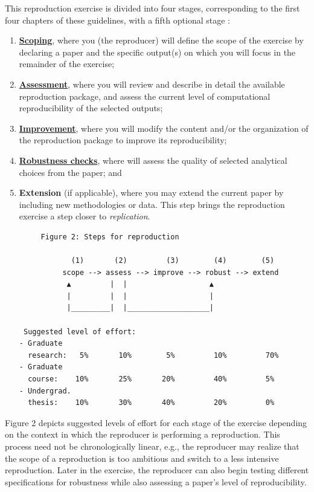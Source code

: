 \documentclass[]{book}
\begin{document}
This reproduction exercise is divided into four stages, corresponding to the first four chapters of these guidelines, with a fifth optional stage :

\begin{enumerate}
\def\labelenumi{\arabic{enumi}.}
\item
  \protect\hyperlink{scoping}{\textbf{Scoping}}, where you (the reproducer) will define the scope of the exercise by declaring a paper and the specific output(s) on which you will focus in the remainder of the exercise;\\
\item
  \protect\hyperlink{assessment}{\textbf{Assessment}}, where you will review and describe in detail the available reproduction package, and assess the current level of computational reproducibility of the selected outputs;
\item
  \protect\hyperlink{improvements}{\textbf{Improvement}}, where you will modify the content and/or the organization of the reproduction package to improve its reproducibility;\\
\item
  \protect\hyperlink{robust}{\textbf{Robustness checks}}, where will assess the quality of selected analytical choices from the paper; and\\
\item
  \textbf{Extension} (if applicable), where you may extend the current paper by including new methodologies or data. This step brings the reproduction exercise a step closer to \emph{replication}.

\begin{verbatim}
     Figure 2: Steps for reproduction

            (1)       (2)         (3)        (4)        (5)
          scope --> assess --> improve --> robust --> extend
           ▲         |  |                   ▲
           |         |  |                   |
           |_________|  |___________________|

 Suggested level of effort:
- Graduate
  research:   5%       10%        5%         10%         70%
- Graduate
  course:    10%       25%       20%         40%         5%
- Undergrad.
  thesis:    10%       30%       40%         20%         0%
\end{verbatim}
\end{enumerate}

Figure 2 depicts suggested levels of effort for each stage of the exercise depending on the context in which the reproducer is performing a reproduction. This process need not be chronologically linear, e.g., the reproducer may realize that the scope of a reproduction is too ambitious and switch to a less intensive reproduction. Later in the exercise, the reproducer can also begin testing different specifications for robustness while also assessing a paper's level of reproducibility.
\end{document}
